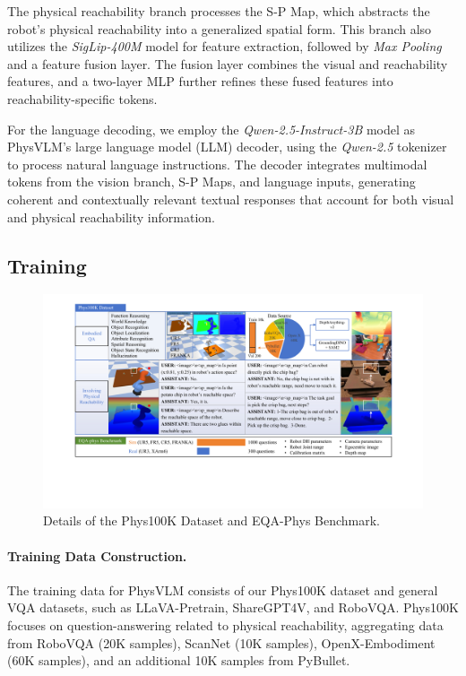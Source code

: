 \documentclass[10pt,twocolumn,letterpaper]{article}
\begin{document}
The physical reachability branch processes the S-P Map, which abstracts the robot's physical reachability into a generalized spatial form. This branch also utilizes the \textit{SigLip-400M} model for feature extraction, followed by \textit{Max Pooling} and a feature fusion layer. The fusion layer combines the visual and reachability features, and a two-layer MLP further refines these fused features into reachability-specific tokens.

For the language decoding, we employ the \textit{Qwen-2.5-Instruct-3B} model \cite{qwen2, qwen2.5} as PhysVLM's large language model (LLM) decoder, using the \textit{Qwen-2.5} tokenizer to process natural language instructions. The decoder integrates multimodal tokens from the vision branch, S-P Maps, and language inputs, generating coherent and contextually relevant textual responses that account for both visual and physical reachability information.




\subsection{Training}
\label{3.3}

\begin{figure}[ht] %
\vskip 0.2in
\begin{center}
\centerline{\includegraphics[width=1\linewidth]{images/image5.pdf}}
\caption{Details of the Phys100K Dataset and EQA-Phys Benchmark.}
\label{image5}
\end{center}
\vskip -0.2in
\end{figure}

\paragraph{Training Data Construction.}
The training data for PhysVLM consists of our Phys100K dataset and general VQA datasets, such as LLaVA-Pretrain, ShareGPT4V, and RoboVQA. Phys100K focuses on question-answering related to physical reachability, aggregating data from RoboVQA (20K samples), ScanNet \cite{scannet} (10K samples), OpenX-Embodiment \cite{openx} (60K samples), and an additional 10K samples from PyBullet.
\end{document}
